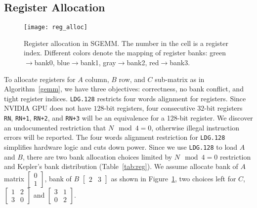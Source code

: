 \subsection{Register Allocation}
\label{sec:register}
\begin{figure}[htbp]
\begin{center}
\texttt{[image: reg\_alloc]}
\caption{\small Register allocation in SGEMM. The number in the cell is a register index.
Different colors denote the mapping of register banks: green$\rightarrow$bank0,
    blue$\rightarrow$bank1, gray$\rightarrow$bank2, red$\rightarrow$bank3.}
\label{fig:reg}
\end{center}
\end{figure}

To allocate registers for $A$ column, $B$ row, and $C$ sub-matrix as in Algorithm~\ref{gemm}, we have three objectives:
correctness, no bank conflict, and tight register indices.
{\tt LDG.128} restricts four words alignment for registers.
Since NVIDIA GPU does not have $128$-bit registers, 
four consecutive $32$-bit registers {\tt RN}, {\tt RN+1}, {\tt RN+2}, and {\tt RN+3} will be an equivalence for a 128-bit
register.
We discover an undocumented restriction that $N\mod4=0$, otherwise illegal instruction errors will be reported.
The four words alignment restriction for {\tt LDG.128} simplifies hardware logic and cuts down power.
Since we use {\tt LDG.128} to load $A$ and $B$, there are two bank allocation choices limited by $N\mod4=0$ restriction and Kepler's bank distribution (Table~\ref{tab:reg}).
We assume allocate bank of $A$ matrix $\begin{bmatrix} 0 \\ 1  \end{bmatrix}$,
   bank of $B$ $\begin{bmatrix} 2 & 3 \end{bmatrix}$ as shown in Figure~\ref{fig:reg}, two choices left for $C$,
$\begin{bmatrix} 1 & 2 \\ 3 & 0  \end{bmatrix}$ and
$\begin{bmatrix} 3 & 1 \\ 0 & 2  \end{bmatrix}$.
